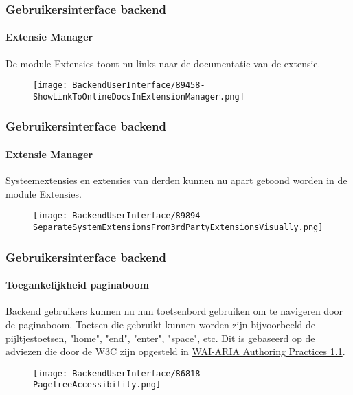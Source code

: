 
\begin{frame}[fragile]
	\frametitle{Gebruikersinterface backend}
	\framesubtitle{Extensie Manager}

	De module Extensies toont nu links naar de documentatie van de extensie.

	\begin{figure}
		\texttt{[image: BackendUserInterface/89458-ShowLinkToOnlineDocsInExtensionManager.png]}
	\end{figure}

\end{frame}


\begin{frame}[fragile]
	\frametitle{Gebruikersinterface backend}
	\framesubtitle{Extensie Manager}

	Systeemextensies en extensies van derden kunnen nu apart getoond worden in de module Extensies.

	\begin{figure}
		\texttt{[image: BackendUserInterface/89894-SeparateSystemExtensionsFrom3rdPartyExtensionsVisually.png]}
	\end{figure}

\end{frame}


\begin{frame}[fragile]
	\frametitle{Gebruikersinterface backend}
	\framesubtitle{Toegankelijkheid paginaboom}

	Backend gebruikers kunnen nu hun toetsenbord gebruiken om te navigeren door de paginaboom.
	Toetsen die gebruikt kunnen worden zijn bijvoorbeeld de pijltjestoetsen, "home", "end", "enter", "space", etc.
	\newline
	Dit is gebaseerd op de adviezen die door de W3C zijn opgesteld in
	\href{https://www.w3.org/TR/wai-aria-practices-1.1/#keyboard-interaction-22}{WAI-ARIA Authoring Practices 1.1}.

	\begin{figure}
		\texttt{[image: BackendUserInterface/86818-PagetreeAccessibility.png]}
	\end{figure}

\end{frame}

